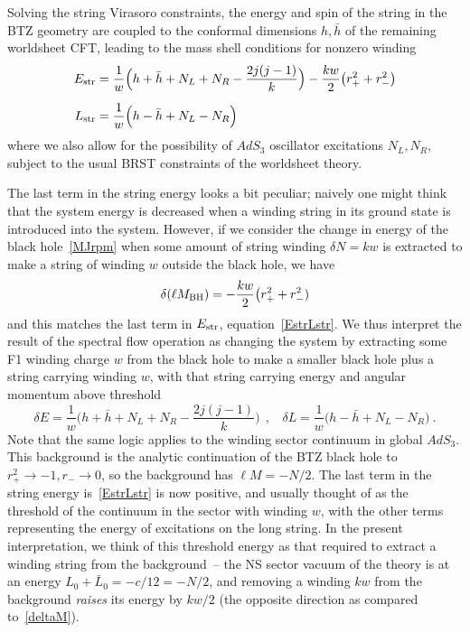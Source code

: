 \documentclass[11pt]{article}
\def\str{{\rm str}}
\def\BH{{\rm BH}}
\def\[{\left[}
\def\be{\begin{equation}}
\def\ee{\end{equation}}
\numberwithin{equation}{section}
\begin{document}
%
Solving the string Virasoro constraints, the energy and spin of the string in the BTZ geometry are coupled to the conformal dimensions $h,\bar h$ of the remaining worldsheet CFT, leading to the mass shell conditions for nonzero winding
\begin{align}
\begin{split}
\label{EstrLstr}
E_\str &= \frac1{w}\Big( {h+\bar h + N_L+ N_R} -\frac{2j(j-1)}k \Big) -\frac{kw}2 \big(r_+^2+r_-^2 \big) 
\\[.2cm]
L_\str &= \frac 1w \Big( h - \bar h +  N_L -  N_R \Big)  
\end{split}
\end{align}
where we also allow for the possibility of $AdS_3$ oscillator excitations $N_L, N_R$, subject to the usual BRST constraints of the worldsheet theory.

The last term in the string energy looks a bit peculiar; naively one might think that the system energy is decreased when a winding string in its ground state is introduced into the system.  However, if we consider the change in energy of the black hole~\eqref{MJrpm} when some amount of string winding $\delta N = kw$ is extracted to make a string of winding $w$ outside the black hole, we have
\be
\label{deltaM}
\delta(\ell M_\BH) = -\frac{kw}{2}\big( r_+^2+r_-^2)
\ee
and this matches the last term in $E_\str$, equation~\eqref{EstrLstr}.  We thus interpret the result of the spectral flow operation as changing the system by extracting some F1 winding charge $w$ from the black hole to make a smaller black hole plus a string carrying winding $w$, with that string carrying energy and angular momentum above threshold
\be
\label{deltaEL}
\delta E = \frac1{w}\Big( {h+\bar h + N_L+ N_R} -\frac{2j(j-1)}k \Big)
~~,~~~~
\delta L = \frac 1w \Big( h - \bar h +  N_L -  N_R \Big)  ~.
\ee
Note that the same logic applies to the winding sector continuum in global $AdS_3$.  This background is the analytic continuation of the BTZ black hole to $r_+^2\to -1, r_-\to 0$, so the background has $\ell M=-N/2$.  The last term in the string energy is~\eqref{EstrLstr} is now positive, and usually thought of as the threshold of the continuum in the sector with winding $w$, with the other terms representing the energy of excitations on the long string.  In the present interpretation, we think of this threshold energy as that required to extract a winding string from the background~-- the NS sector vacuum of the theory is at an energy $L_0 +\bar L_0 = -c/12 = -N/2$, and removing a winding $kw$ from the background {\it raises} its energy by $kw/2$ (the opposite direction as compared to~\eqref{deltaM}).
\end{document}
